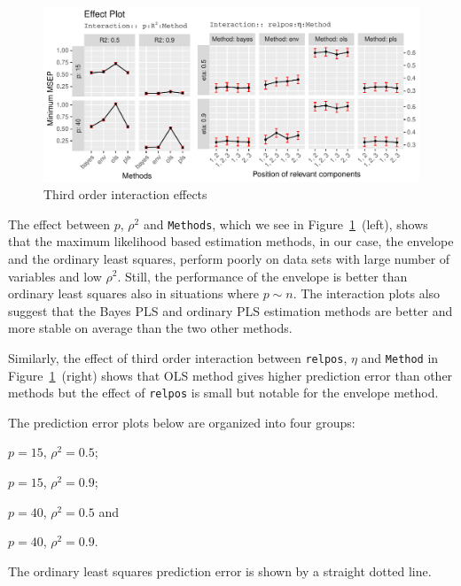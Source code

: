\documentclass[a4paper, 11pt]{article}
\begin{document}
\begin{figure}[!ht]
  \centering
  \includegraphics[width=\textwidth]{pdf/effect-plot}
  \caption{Third order interaction effects}
  \label{fig:effect-plot}
\end{figure}

The effect between $p$, $\rho^2$ and {\tt Methods}, which we see in Figure~\ref{fig:effect-plot}~(left), shows that the maximum likelihood based estimation methods, in our case, the envelope and the ordinary least squares, perform poorly on data sets with large number of variables and low $\rho^2$. Still, the performance of the envelope is better than ordinary least squares also in situations where $p\sim n$. The interaction plots also suggest that the Bayes PLS and ordinary PLS estimation methods are better and more stable on average than the two other methods.

Similarly, the effect of third order interaction between {\tt relpos}, $\eta$ and {\tt Method} in Figure~\ref{fig:effect-plot}~(right) shows that OLS method gives higher prediction error than other methods but the effect of {\tt relpos} is small but notable for the envelope method.

The prediction error plots below are organized into four groups:
\begin{enumerate*}[label = \alph*)]
\item \label{lst:g1} $p = 15$, $\rho^2 = 0.5$;
\item \label{lst:g2} $p = 15$, $\rho^2 = 0.9$;
\item \label{lst:g3} $p = 40$, $\rho^2 = 0.5$ and
\item \label{lst:g4} $p = 40$, $\rho^2 = 0.9$.
\end{enumerate*}
  The ordinary least squares prediction error is shown by a straight dotted line.
\end{document}
